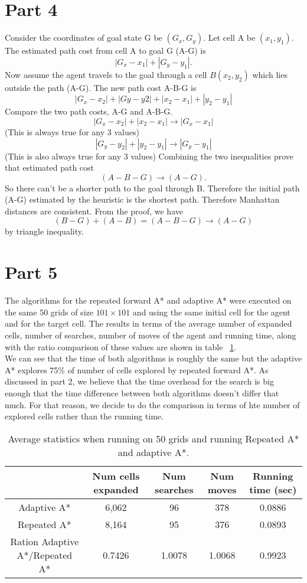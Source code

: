 \documentclass{article}
\begin{document}
\section*{Part 4}
Consider the coordinates of goal state G be $(G_x,G_y)$. Let cell A be $(x_1,y_1)$. The estimated path cost from cell A to goal G (A-G) is $$|G_x-x_1|+|G_y-y_1|.$$ Now assume the agent travels to the goal through a cell $B (x_2,y_2)$ which lies outside the path (A-G). The new path cost A-B-G is $$|G_x- x_2|+|Gy-y2|+|x_2-x_1|+|y_2-y_1|$$
Compare the two path costs, A-G and A-B-G.
\\
$$|G_x-x_2|+|x_2-x_1| \rightarrow  |G_x-x_1|$$(This is always true for any 3 values) $$ |G_y-y_2|+|y_2-y_1|   \rightarrow |G_y-y_1|$$(This is also always true for any 3 values)
Combining the two inequalities prove that estimated path cost $$(A-B-G) \rightarrow (A-G). $$So there can't be a shorter path to the goal through B. Therefore the initial path (A-G) estimated by the heuristic is the shortest path. Therefore Manhattan distances are consistent.
From the proof, we have $$(B-G)+(A-B)=(A-B-G) \rightarrow (A-G)$$  by triangle inequality.

\section*{Part 5}
The algorithms for the repeated forward A* and adaptive A* were executed on the same 50 grids of size $101 \times 101$ and using the same initial cell for the agent and for the target cell. The results in terms of the average number of expanded cells, number of searches, number of moves of the agent and running time, along with the ratio comparison of these values are shown in table~ \ref{tab:adaptive}.\\
We can see that the time of both algorithms is roughly the same but the adaptive A* explores 75\% of number of cells explored by repeated forward A*. As discussed in part 2, we believe that the time overhead for the search is big enough that the time difference between both algorithms doesn't differ that much. For that reason, we decide to do the comparison in terms of hte number of explored cells rather than the running time.

\begin{table}[ht]
  \begin{center}
    \begin{tabular}{|*{5}{c|}}
      \cline{2-5}
      \multicolumn{1}{c|}{} & Num cells expanded & Num searches & Num moves & Running time (sec) \\ \hline
      Adaptive A* & 6,062 & 96 & 378 & 0.0886\\ \hline 
      Repeated A*  & 8,164  & 95 & 376 & 0.0893 \\ \hline \hline
      Ration Adaptive A*/Repeated A* & 0.7426 & 1.0078 & 1.0068 & 0.9923 \\ \hline
    \end{tabular}
  \end{center}
  \caption{Average statistics when running on 50 grids and running Repeated A* and adaptive A*.}
  \label{tab:adaptive}
\end{table}
\end{document}
